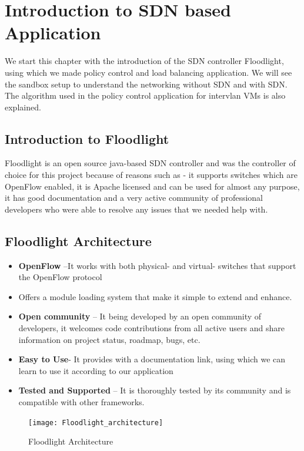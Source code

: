 \chapter{Introduction to SDN based Application}

We start this chapter with the introduction of the SDN controller Floodlight, using which we made policy control and load balancing application. We will see the sandbox setup to understand the networking without SDN and with SDN. The algorithm used in the policy control application for intervlan VMs is also explained.
\section{Introduction to Floodlight}
Floodlight is an open source java-based SDN controller and was the controller of choice for this project because of reasons such as - it supports switches which are OpenFlow enabled, it is Apache licensed and can be used for almost any purpose, it has good documentation and a very active community of professional developers who were able to resolve any issues that we needed help with.


\section{Floodlight Architecture}
\begin{itemize}
\item \textbf{OpenFlow} –It works with both physical- and virtual- switches that support the OpenFlow protocol
\item Offers a module loading system that make it simple to extend and enhance. 

\item \textbf{Open community} – It being developed by an open community of developers, it welcomes code contributions from all active users and share information on project status, roadmap, bugs, etc.

\item \textbf{Easy to Use}- It provides with a documentation link, using which we can learn to use it according to our application

\item \textbf{Tested and Supported} – It is thoroughly tested by its community and is compatible with other frameworks.

\end{itemize}
    
\begin{figure}[h]
\caption{Floodlight Architecture}
\centering
\texttt{[image: Floodlight\_architecture]}
\end{figure}

